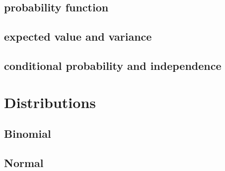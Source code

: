 \documentclass[11pt]{article}
\begin{document}
\subsection*{probability function}
\label{sec-2-1}
\subsection*{expected value and variance}
\label{sec-2-2}
\subsection*{conditional probability and independence}
\label{sec-2-3}

\section*{Distributions}
\label{sec-3}
\subsection*{Binomial}
\label{sec-3-1}
\subsection*{Normal}
\label{sec-3-2}
\end{document}
